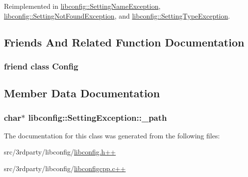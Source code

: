 Reimplemented in \hyperlink{classlibconfig_1_1SettingNameException_a6a65369f3eb5c02ee92fc71a31c99ebc}{libconfig\-::\-Setting\-Name\-Exception}, \hyperlink{classlibconfig_1_1SettingNotFoundException_a10ddbf9dfba0e1d43e84ad9f746f4dc3}{libconfig\-::\-Setting\-Not\-Found\-Exception}, and \hyperlink{classlibconfig_1_1SettingTypeException_a50c015f8011c3ffa3dce6a4a25072ec7}{libconfig\-::\-Setting\-Type\-Exception}.



\subsection{Friends And Related Function Documentation}
\hypertarget{classlibconfig_1_1SettingException_ac3da7e21a05bf8852638db7e4dd1b81a}{
\subsubsection[{Config}]{\setlength{\rightskip}{0pt plus 5cm}friend class {\bf Config}\hspace{0.3cm}{\ttfamily [friend]}}}\label{classlibconfig_1_1SettingException_ac3da7e21a05bf8852638db7e4dd1b81a}


\subsection{Member Data Documentation}
\hypertarget{classlibconfig_1_1SettingException_a6ff6948c979fb2af8e940741416b6d89}{
\subsubsection[{\-\_\-path}]{\setlength{\rightskip}{0pt plus 5cm}char$\ast$ libconfig\-::\-Setting\-Exception\-::\-\_\-path\hspace{0.3cm}{\ttfamily [private]}}}\label{classlibconfig_1_1SettingException_a6ff6948c979fb2af8e940741416b6d89}


The documentation for this class was generated from the following files\-:\begin{DoxyCompactItemize}
\item 
src/3rdparty/libconfig/\hyperlink{libconfig_8h_09_09}{libconfig.\-h++}\item 
src/3rdparty/libconfig/\hyperlink{libconfigcpp_8c_09_09}{libconfigcpp.\-c++}\end{DoxyCompactItemize}
